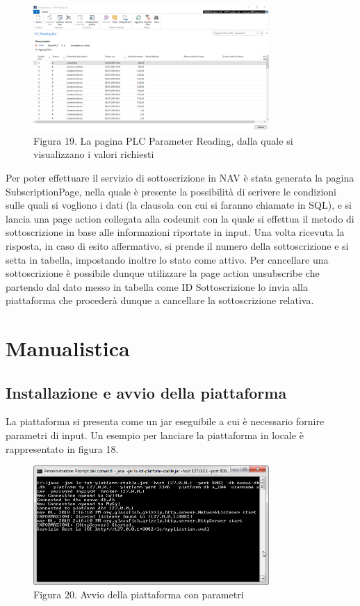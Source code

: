 \begin{figure}[h]
	\centering
	\includegraphics[width=0.8\textwidth]{PLC-Reading-List.png}
	\caption*{Figura 19. La pagina PLC Parameter Reading, dalla quale si visualizzano i valori richiesti}
\end{figure}

Per poter effettuare il servizio di sottoscrizione in NAV è stata generata la pagina SubscriptionPage, nella quale è presente la possibilità di scrivere le condizioni sulle quali si vogliono i dati (la clausola con cui si faranno chiamate in SQL), e si lancia una page action collegata alla codeunit con la quale si effettua il metodo di sottoscrizione in base alle informazioni riportate in input. Una volta ricevuta la risposta, in caso di esito affermativo, si prende il numero della sottoscrizione e si setta in tabella, impostando inoltre lo stato come attivo. Per cancellare una sottoscrizione è possibile dunque utilizzare la page action unsubscribe che partendo dal dato messo in tabella come ID Sottoscrizione lo invia alla piattaforma che procederà dunque a cancellare la sottoscrizione relativa. 
\clearpage
\section{Manualistica}
\subsection{Installazione e avvio della piattaforma}
La piattaforma si presenta come un jar eseguibile a cui è necessario fornire parametri di input. Un esempio per lanciare la piattaforma in locale è rappresentato in figura 18.
\begin{figure}[h]
			\centering
			\includegraphics[width=0.8\textwidth]{lancio-piattaforma.png}
			\caption*{Figura 20. Avvio della piattaforma con parametri}
\end{figure}


